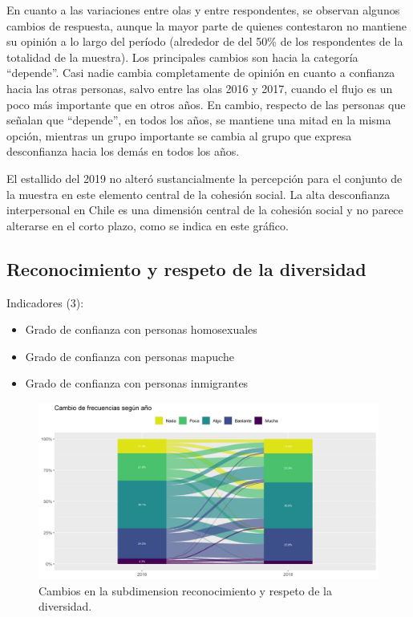 \documentclass[
  12pt,
]{book}
\begin{document}
En cuanto a las variaciones entre olas y entre respondentes, se observan algunos cambios de respuesta, aunque la mayor parte de quienes contestaron no mantiene su opinión a lo largo del período (alrededor de del 50\% de los respondentes de la totalidad de la muestra). Los principales cambios son hacia la categoría ``depende''. Casi nadie cambia completamente de opinión en cuanto a confianza hacia las otras personas, salvo entre las olas 2016 y 2017, cuando el flujo es un poco más importante que en otros años. En cambio, respecto de las personas que señalan que ``depende'', en todos los años, se mantiene una mitad en la misma opción, mientras un grupo importante se cambia al grupo que expresa desconfianza hacia los demás en todos los años.

El estallido del 2019 no alteró sustancialmente la percepción para el conjunto de la muestra en este elemento central de la cohesión social. La alta desconfianza interpersonal en Chile es una dimensión central de la cohesión social y no parece alterarse en el corto plazo, como se indica en este gráfico.

\hypertarget{reconocimiento-y-respeto-de-la-diversidad}{%
\subsection{Reconocimiento y respeto de la diversidad}\label{reconocimiento-y-respeto-de-la-diversidad}}

Indicadores (3):

\begin{itemize}
\item
  Grado de confianza con personas homosexuales
\item
  Grado de confianza con personas mapuche
\item
  Grado de confianza con personas inmigrantes
\end{itemize}

\begin{figure}[H]

{\centering \includegraphics[width=1\linewidth,height=1\textheight]{output/graphs/alluvial_diversidad} 

}

\caption{Cambios en la subdimension reconocimiento y respeto de la diversidad.}\label{fig:alluvial-diversidad}
\end{figure}
\end{document}
